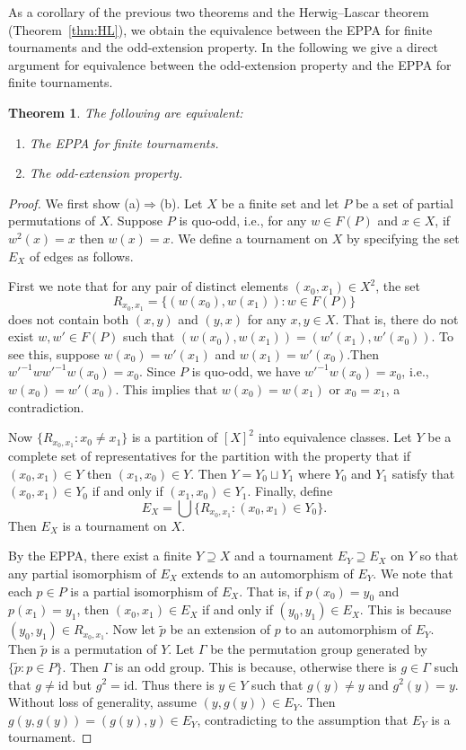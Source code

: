 \documentclass[10pt,a4paper]{amsart}
\newtheorem{theorem}{Theorem}[section]
\theoremstyle{definition}
\theoremstyle{definition}
\numberwithin{equation}{section}
\begin{document}
As a corollary of the previous two theorems and the Herwig--Lascar theorem (Theorem~\ref{thm:HL}), we obtain the equivalence between the EPPA for finite tournaments and the odd-extension property. In the following we give a direct argument for equivalence between the odd-extension property and the EPPA for finite tournaments.

\begin{theorem}\label{thm:EPPAtoOEP} The following are equivalent:
\begin{enumerate}
\item[(a)] The EPPA for finite tournaments. 
\item[(b)] The odd-extension property.
\end{enumerate}
\end{theorem}

\begin{proof} We first show (a)$\Rightarrow$(b). Let $X$ be a finite set and let $P$ be a set of partial permutations of $X$. Suppose $P$ is quo-odd, i.e., for any $w\in F(P)$ and $x\in X$, if $w^2(x)=x$ then $w(x)=x$. We define a tournament on $X$ by specifying the set $E_X$ of edges as follows.

First we note that for any pair of distinct elements $(x_0,x_1)\in X^2$, the set
$$ R_{x_0, x_1}=\{(w(x_0), w(x_1))\colon w\in F(P)\} $$
does not contain both $(x,y)$ and $(y,x)$ for any $x,y\in X$. That is, there do not exist $w, w'\in F(P)$ such that $(w(x_0), w(x_1))=(w'(x_1), w'(x_0))$. To see this, suppose $w(x_0)=w'(x_1)$ and $w(x_1)=w'(x_0)$.Then $w'^{-1}ww'^{-1}w(x_0)=x_0$. Since $P$ is quo-odd, we have $w'^{-1}w(x_0)=x_0$, i.e., $w(x_0)=w'(x_0)$. This implies that $w(x_0)=w(x_1)$ or $x_0=x_1$, a contradiction. 

Now $\{R_{x_0, x_1}\colon x_0\neq x_1\}$ is a partition of $[X]^2$ into equivalence classes. Let $Y$ be a complete set of representatives for the partition with the property that if $(x_0,x_1)\in Y$ then $(x_1, x_0)\in Y$. Then $Y=Y_0\sqcup Y_1$ where  $Y_0$ and $Y_1$ satisfy that $(x_0,x_1)\in Y_0$ if and only if $(x_1,x_0)\in Y_1$. Finally, define 
$$ E_X=\bigcup\{ R_{x_0,x_1}\colon (x_0, x_1)\in Y_0\}. $$
Then $E_X$ is a tournament on $X$.

By the EPPA, there exist a finite $Y\supseteq X$ and a tournament $E_Y\supseteq E_X$ on $Y$ so that any partial isomorphism of $E_X$ extends to an automorphism of $E_Y$. We note that each $p\in P$ is a partial isomorphism of $E_X$. That is, if $p(x_0)=y_0$ and $p(x_1)=y_1$, then $(x_0, x_1)\in E_X$ if and only if $(y_0, y_1)\in E_X$. This is because $(y_0, y_1)\in R_{x_0, x_1}$. Now let $\tilde{p}$ be an extension of $p$ to an automorphism of $E_Y$. Then $\tilde{p}$ is a permutation of $Y$. Let $\Gamma$ be the permutation group generated by $\{\tilde{p}\colon p\in P\}$. Then $\Gamma$ is an odd group. This is because, otherwise there is $g\in \Gamma$ such that $g\neq \mbox{id}$ but $g^2=\mbox{id}$. Thus there is $y\in Y$ such that $g(y)\neq y$ and $g^2(y)=y$. Without loss of generality, assume $(y, g(y))\in E_Y$. Then $g(y, g(y))=(g(y), y)\in E_Y$, contradicting to the assumption that $E_Y$ is a tournament. 


\end{proof}
\end{document}
